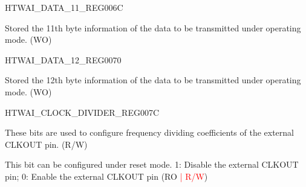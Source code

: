 \begin{register}{H}{TWAI\_DATA\_11\_REG}{\hexprefix{}006C}\label{regdesc:TWAIDATA11REG}
%
%
\regnewline%
\begin{regdesc}\begin{reglist}
\label{fielddesc:TWAITXBYTE11}\item [TWAI\_TX\_BYTE\_11] Stored the 11th byte information of the data to be transmitted under operating mode. (WO)
\end{reglist}\end{regdesc}
\end{register}


\begin{register}{H}{TWAI\_DATA\_12\_REG}{\hexprefix{}0070}\label{regdesc:TWAIDATA12REG}
%
%
\regnewline%
\begin{regdesc}\begin{reglist}
\label{fielddesc:TWAITXBYTE12}\item [TWAI\_TX\_BYTE\_12] Stored the 12th byte information of the data to be transmitted under operating mode. (WO)
\end{reglist}\end{regdesc}
\end{register}


\begin{register}{H}{TWAI\_CLOCK\_DIVIDER\_REG}{\hexprefix{}007C}\label{regdesc:TWAICLOCKDIVIDERREG}
%
%
%
\regnewline%
\begin{regdesc}\begin{reglist}
\label{fielddesc:TWAICD}\item [TWAI\_CD] These bits are used to configure frequency dividing coefficients of the external CLKOUT pin. (R/W)
\label{fielddesc:TWAICLOCKOFF}\item [TWAI\_CLOCK\_OFF] This bit can be configured under reset mode. 1: Disable the external CLKOUT pin; 0: Enable the external CLKOUT pin (RO \textcolor{red}{| R/W})
\end{reglist}\end{regdesc}
\end{register}


